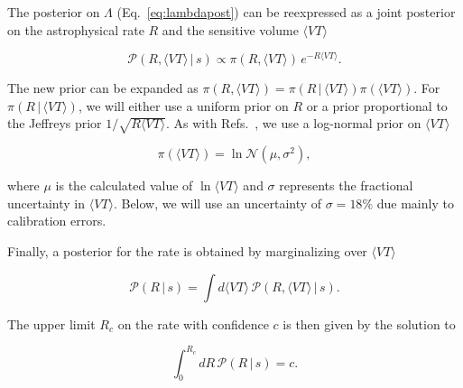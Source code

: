 The posterior on $\Lambda$ (Eq.~\ref{eq:lambdapost}) can be reexpressed as a joint
posterior on the astrophysical rate $R$ and the sensitive volume  $\langle VT \rangle$
\begin{linenomath*}
\begin{equation}
    \mathcal{P}(R, \langle VT \rangle \, | \, s) \propto \pi(R, \langle VT \rangle) \, e^{-R \langle VT \rangle}.
\end{equation}
\end{linenomath*}
%
The new prior can be expanded as $\pi(R, \langle VT \rangle) = \pi(R \, | \, \langle VT \rangle) \pi(\langle VT \rangle)$. 
For $\pi(R \, | \, \langle VT \rangle)$, we will either use a uniform prior on $R$ or a prior proportional to the 
Jeffreys prior $1/\sqrt{R \langle VT \rangle}$. As with Refs.~\citep{Abbott:2016nhf, Abbott:2016drs, TheLIGOScientific:2016pea}, 
we use a log-normal prior on $\langle VT \rangle$
%
\begin{linenomath*}
\begin{equation}
\pi(\langle VT \rangle) = \ln \mathcal{N}(\mu, \sigma^2),
\end{equation}
\end{linenomath*}
%
where $\mu$ is the calculated value of $\ln\langle VT \rangle$ and $\sigma$ represents the fractional uncertainty
in $\langle VT \rangle$. Below, we will use an uncertainty of
$\sigma=18\%$ due mainly to calibration errors.

Finally, a posterior for the rate is obtained by marginalizing over $\langle VT \rangle$
%
\begin{linenomath*}
\begin{equation}
\mathcal{P}(R \, | \, s) = \int d\langle VT \rangle\, \mathcal{P} (R, \langle VT \rangle \, | \, s).
\label{eq:posterior}
\end{equation}
\end{linenomath*}
%
The upper limit $R_c$ on the rate with confidence $c$ is then given by the solution to
%
\begin{linenomath*}
\begin{equation}
\label{eq:upperlimit}
\int_0^{R_c} dR\, \mathcal{P}(R \, | \, s) = c.
\end{equation}
\end{linenomath*}

